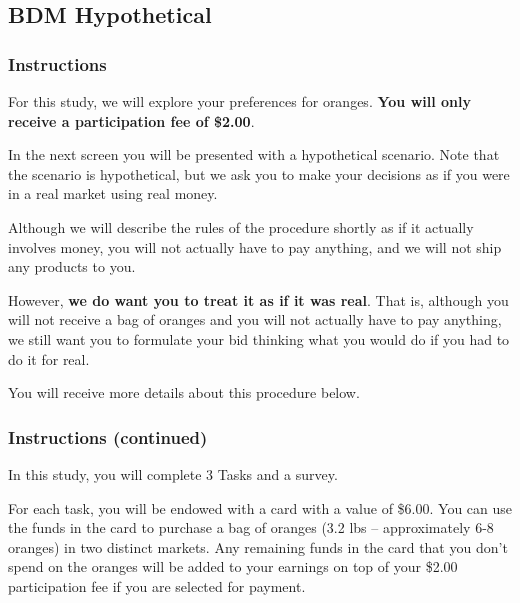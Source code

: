 \documentclass[12pt]{article}
\begin{document}
\clearpage


\subsection{BDM Hypothetical}

\subsubsection*{Instructions }


For this study, we will explore your preferences for oranges. \textbf{You will only receive a participation fee of \$2.00}. \par

 In the next screen you will be presented with a hypothetical scenario. Note that the scenario is hypothetical, but we ask you to make your decisions as if you were in a real market using real money. \par

Although we will describe the rules of the procedure shortly as if it actually involves money, you will not actually have to pay anything, and we will not ship any products to you. \par

However,\textbf{ we do want you to treat it as if it was real}. That is, although you will not receive a bag of oranges and you will not actually have to pay anything, we still want you to formulate your bid thinking what you would do if you had to do it for real. \par

You will receive more details about this procedure below.

\clearpage



\subsubsection*{Instructions (continued)}

In this study, you will complete 3 Tasks and a survey.

For each task, you will be endowed with a card with a value of \$6.00. You can use the funds in the card to purchase a bag of oranges (3.2 lbs – approximately 6-8 oranges) in two distinct markets. Any remaining funds in the card that you don’t spend on the oranges will be added to your earnings on top of your \$2.00 participation fee if you are selected for payment.
\end{document}
